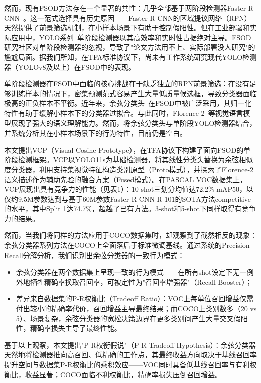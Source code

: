 \documentclass[zihao=5,a4paper,twocolumn]{ctexart}
\begin{document}
然而，现有FSOD方法存在一个显著的共性：几乎全部基于两阶段检测器Faster R-CNN~\cite{ren2015faster}。这一范式选择具有历史原因——Faster R-CNN的区域提议网络（RPN）天然提供了前景筛选机制，在小样本场景下有助于控制假阳性。但在工业部署和实际应用中，YOLO系列~\cite{redmon2016yolo,jocher2023ultralytics}单阶段检测器以其高效率和实时性占据绝对主导。FSOD研究社区对单阶段检测器的忽视，导致了"论文方法用不上、实际部署没人研究"的尴尬局面。据我们所知，在TFA标准协议下，尚未有工作系统研究现代YOLO检测器（YOLOv8及以上）在FSOD中的表现。

单阶段检测器在FSOD中面临的核心挑战在于缺乏独立的RPN前景筛选：在没有足够训练样本的情况下，密集预测范式容易产生大量低质量候选框，导致分类器面临极高的正负样本不平衡。近年来，余弦分类头~\cite{wang2020tfa}在FSOD中被广泛采用，其归一化特性有助于缓解小样本下的分类器过拟合。与此同时，Florence-2~\cite{xiao2024florence2}等视觉语言模型展现了强大的语义理解能力。然而，将余弦分类头与单阶段YOLO检测器结合，并系统分析其在小样本场景下的行为特性，目前仍是空白。

本文提出VCP（Visual-Cosine-Prototype），在TFA协议下构建了面向FSOD的单阶段检测框架。VCP以YOLO11s为基础检测器，将其线性分类头替换为余弦相似度分类器，利用支持集视觉特征构造类别原型（Proto模式），并探索了Florence-2语义描述作为辅助先验的融合方案（Fused模式）。在PASCAL VOC数据集上，VCP展现出具有竞争力的性能（见表1）：10-shot三划分均值达72.2\% mAP50，以仅约9.5M参数达到与基于60M参数Faster R-CNN R-101的SOTA方法competitive的水平，其中Split 1达74.7\%，超越了已有方法。3-shot和5-shot下同样取得有竞争力的结果。

然而，当我们将同样的方法应用于COCO数据集时，却观察到了截然相反的现象：余弦分类器系列方法在COCO上全面落后于标准微调基线。通过系统的Precision-Recall分解分析，我们识别出余弦分类器的一致行为模式：

\begin{itemize}
\item 余弦分类器在两个数据集上呈现一致的行为模式——在所有shot设定下无一例外地牺牲精确率换取召回率，可被定性为"召回率增强器"（Recall Booster）；
\item 差异来自数据集的P-R权衡比（Tradeoff Ratio）：VOC上每单位召回增益仅需付出较小的精确率代价，召回增益主导最终结果；而COCO上类别数多（20 vs 5）、场景复杂，余弦分类器的宽松决策边界在更多类别间产生大量交叉假阳性，精确率损失主导了最终性能。
\end{itemize}

基于以上观察，本文提出"P-R权衡假说"（P-R Tradeoff Hypothesis）：余弦分类器天然地将检测器推向高召回、低精确的工作点，其最终收益方向取决于基线召回率提升空间与数据集P-R权衡比的乘积效应——VOC同时具备低基线召回率与有利权衡比，收益显著；COCO面临不利权衡比，精确率损失压倒召回增益。
\end{document}
